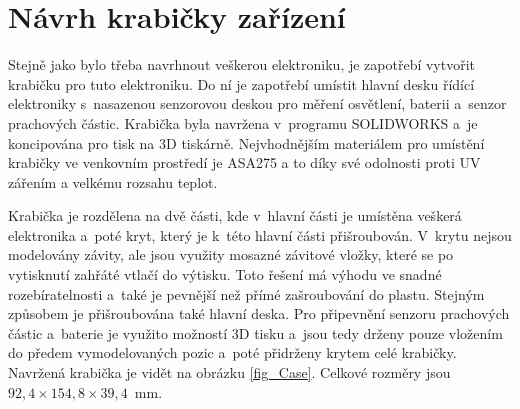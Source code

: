 \chapter{Návrh krabičky zařízení}

Stejně jako bylo třeba navrhnout veškerou elektroniku, je zapotřebí vytvořit krabičku pro tuto elektroniku. Do ní je zapotřebí umístit hlavní desku řídící elektroniky s~nasazenou senzorovou deskou pro měření osvětlení, baterii a~senzor prachových částic. Krabička byla navržena v~programu SOLIDWORKS a~je koncipována pro tisk na 3D tiskárně. Nejvhodnějším materiálem pro umístění krabičky ve venkovním prostředí je ASA275 a to díky své odolnosti proti UV zářením a velkému rozsahu teplot.

Krabička je rozdělena na dvě části, kde v~hlavní části je umístěna veškerá elektronika a~poté kryt, který je k~této hlavní části přišroubován. V~krytu nejsou modelovány závity, ale jsou využity mosazné závitové vložky, které se po vytisknutí zahřáté vtlačí do výtisku. Toto řešení má výhodu ve snadné rozebíratelnosti a~také je pevnější než přímé zašroubování do plastu. Stejným způsobem je přišroubována také hlavní deska. Pro připevnění senzoru prachových částic a~baterie je využito možností 3D tisku a~jsou tedy drženy pouze vložením do předem vymodelovaných pozic a~poté přidrženy krytem celé krabičky. Navržená krabička je vidět na obrázku \ref{fig_Case}. Celkové rozměry jsou $92,4 \times 154,8 \times 39,4$\SI{}{\milli\metre}.

